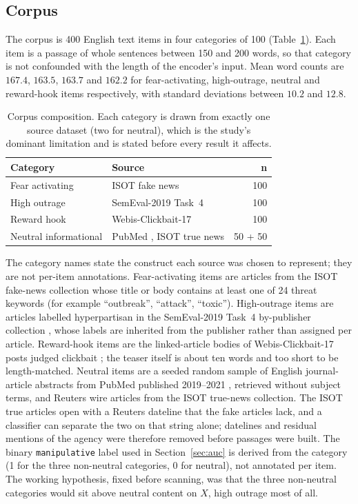 \documentclass[preprint,12pt]{elsarticle}
\begin{document}
\subsection{Corpus}
\label{sec:corpus}

The corpus is 400 English text items in four categories of 100
(Table~\ref{tab:corpus}). Each item is a passage of whole sentences between 150 and 200
words, so that category is not confounded with the length of the encoder's input. Mean word
counts are $167.4$, $163.5$, $163.7$ and $162.2$ for fear-activating, high-outrage, neutral
and reward-hook items respectively, with standard deviations between $10.2$ and $12.8$.

\begin{table}[htbp]
\centering
\begin{tabular}{@{}llr@{}}
\toprule
\textbf{Category} & \textbf{Source} & \textbf{n} \\
\midrule
Fear activating       & ISOT fake news \cite{ahmed2017}         & 100 \\
High outrage          & SemEval-2019 Task~4 \cite{kiesel2019}   & 100 \\
Reward hook           & Webis-Clickbait-17 \cite{potthast2018}  & 100 \\
Neutral informational & PubMed \cite{pubmed}, ISOT true news \cite{ahmed2017} & 50 + 50 \\
\bottomrule
\end{tabular}
\caption{Corpus composition. Each category is drawn from exactly one source dataset (two
for neutral), which is the study's dominant limitation and is stated before every result it
affects.}
\label{tab:corpus}
\end{table}

The category names state the construct each source was chosen to represent; they are not
per-item annotations. Fear-activating items are articles from the ISOT fake-news collection
\cite{ahmed2017} whose title or body contains at least one of 24 threat keywords (for example
``outbreak'', ``attack'', ``toxic''). High-outrage items are articles labelled hyperpartisan in
the SemEval-2019 Task~4 by-publisher collection \cite{kiesel2019}, whose labels are inherited
from the publisher rather than assigned per article. Reward-hook items are the linked-article
bodies of Webis-Clickbait-17 posts judged clickbait \cite{potthast2018}; the teaser itself is
about ten words and too short to be length-matched. Neutral items are a seeded random sample
of English journal-article abstracts from PubMed published 2019--2021 \cite{pubmed}, retrieved
without subject terms, and Reuters wire articles from the ISOT true-news collection. The ISOT
true articles open with a Reuters dateline that the fake articles lack, and a classifier can
separate the two on that string alone; datelines and residual mentions of the agency were
therefore removed before passages were built. The binary \texttt{manipulative} label used in
Section~\ref{sec:auc} is derived from the category (1 for the three non-neutral categories,
0 for neutral), not annotated per item. The working hypothesis, fixed before scanning, was
that the three non-neutral categories would sit above neutral content on $X$, high outrage
most of all.
\end{document}
